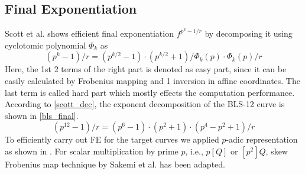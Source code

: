 \subsection{Final Exponentiation}
Scott et al. \cite{PAIRING:SBCDK09a} shows efficient final exponentiation $f^{p^k-1/r}$ by decomposing it using cyclotomic polynomial $\Phi_{k}$ as 
\begin{equation}\label{scott_dec}
(p^k-1)/r = (p^{k/2}-1) \cdot(p^{k/2}+1)/\Phi_{k}(p)\cdot \Phi_{k}(p)/r
\end{equation}
Here, the 1st 2 terms of the right part is denoted as easy part, since it can be easily calculated by Frobenius mapping and 1 inversion in affine coordinates. 
The last term is called hard part which mostly effects the computation performance.
According to \eqref{scott_dec}, the exponent decomposition of the BLS-12 curve is shown in \eqref{bls_final}.
\begin{equation}\label{bls_final}
(p^{12}-1)/r = (p^{6}-1) \cdot(p^{2}+1)\cdot (p^4-p^2+1)/r
\end{equation}
To efficiently carry out FE for the target curves we applied $p$-adic representation as shown in \cite{EPRINT:GhaFou16a}.
For scalar multiplication by prime $p$, i.e., $p[Q]$ or $[p^2]Q$, skew Frobenius map technique by Sakemi et al. \cite{CANS:SNOKM08} has been adapted.

